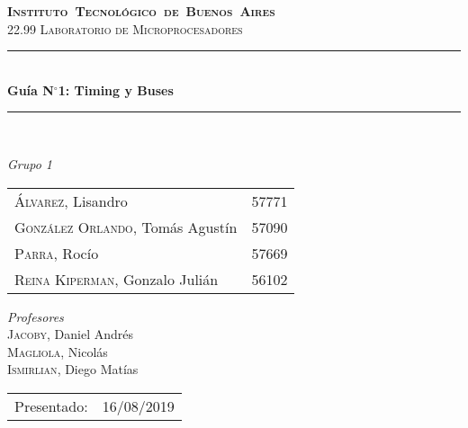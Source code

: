 \begin{titlepage}

\def\titulo{Gu\'ia N$^\circ$1: Timing y Buses}
\def\fecha-entrega{16/08/2019}



\newcommand{\HRule}{\rule{\linewidth}{0.5mm}}
\center
\mbox{\textsc{\LARGE \bfseries {Instituto Tecnol\'ogico de Buenos Aires}}}\\[1.5cm]
\textsc{\Large 22.99 Laboratorio de Microprocesadores}\\[0.5cm]


\HRule \\[0.6cm]
{ \Huge \bfseries \titulo }\\[0.4cm] %
\HRule \\[1.5cm]


{\large

\emph{Grupo 1}\\
\vspace{3px}

\begin{tabular}{lr} 	
\textsc{\'Alvarez}, Lisandro  & 57771 \\
\textsc{Gonz\'alez Orlando}, Tom\'as Agust\'in  & 57090 \\
\textsc{Parra}, Roc\'io  & 57669 \\
\textsc{Reina Kiperman}, Gonzalo Juli\'an  & 56102 \\
\end{tabular}

\vspace{30px}

\emph{Profesores}\\
\vspace{3px}
\textsc{Jacoby}, Daniel Andr\'es\\ 	
\textsc{Magliola}, Nicol\'as\\ 	
\textsc{Ismirlian}, Diego Mat\'ias\\ 	

\vspace{120px}

\begin{tabular}{ll}

Presentado: & \fecha-entrega\\

\end{tabular}

}

\vfill

\end{titlepage}